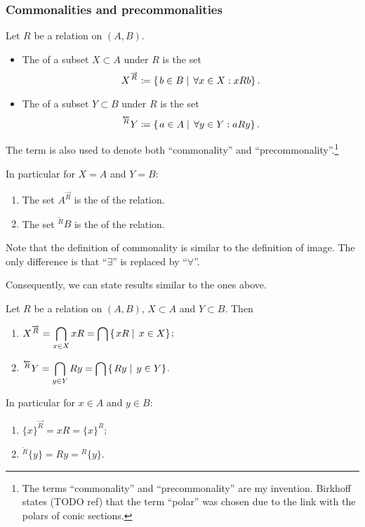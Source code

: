 \subsubsection{Commonalities and precommonalities}
\begin{definition}
Let $R$ be a relation on $(A, B)$.
\begin{itemize}
\item The  of a subset $X\subset A$ under $R$ is the set
\[ X^{\overrightarrow{R}} \coloneqq \left\{\left. b\in B \;\right|\; \forall x\in X: xRb \right\}. \]
\item The  of a subset $Y\subset B$ under $R$ is the set
\[ ^{\overleftarrow{R}}Y \coloneqq \left\{\left. a\in A \;\right|\; \forall y\in Y: aRy \right\}. \]
\end{itemize}
The term  is also used to denote both ``commonality'' and ``precommonality''.\footnote{The terms ``commonality'' and ``precommonality'' are my invention. Birkhoff states (TODO ref) that the term ``polar'' was chosen due to the link with the polars of conic sections.}

In particular for $X=A$ and $Y=B$:
\begin{enumerate}
\item The set $A^{\overrightarrow{R}}$ is the  of the relation.
\item The set $^{\overleftarrow{R}}B$ is the  of the relation.
\end{enumerate}
\end{definition}
Note that the definition of commonality is similar to the definition of image. The only difference is that ``$\exists$'' is replaced by ``$\forall$''.

Consequently, we can state results similar to the ones above.

\begin{lemma}
Let $R$ be a relation on $(A, B)$, $X\subset A$ and $Y\subset B$. Then
\begin{enumerate}
\item $X^{\overrightarrow{R}} = \displaystyle\bigcap_{x\in X}xR = \bigcap \left\{\left. xR \;\right|\; x\in X \right\}$;
\item $^{\overleftarrow{R}}Y = \displaystyle\bigcap_{y\in Y}Ry = \bigcap \left\{\left. Ry \;\right|\; y\in Y \right\}$.
\end{enumerate}
In particular for $x\in A$ and $y\in B$:
\begin{enumerate}
\item $\{x\}^{\overrightarrow{R}} = xR = \{x\}^R$;
\item $^{\overleftarrow{R}}\{y\} = Ry = {^R\{y\}}$.
\end{enumerate}
\end{lemma}

